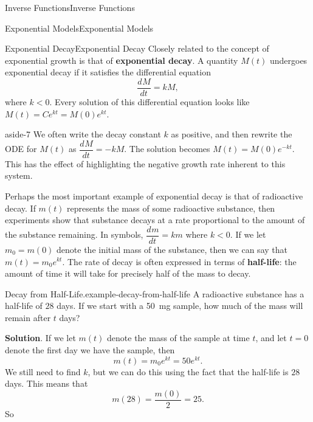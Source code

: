 \documentclass[10pt,]{book}
\newcommand{\terminology}[1]{\textbf{#1}}
\numberwithin{equation}{section}
\newcommand{\dv}[3][]{\dfrac{d^{#1} #2}{d #3^{#1}}}
\begin{document}
\begin{chapterptx}{Inverse Functions}{}{Inverse Functions}{}{}
\begin{sectionptx}{Exponential Models}{}{Exponential Models}{}{}
\typeout{************************************************}
%
\begin{subsectionptx}{Exponential Decay}{}{Exponential Decay}{}{}\label{subsection-exponential-decay}
\hypertarget{p-252}{}%
Closely related to the concept of exponential growth is that of \terminology{exponential decay}. A quantity \(M(t)\) undergoes exponential decay if it satisfies the differential equation%
\begin{equation*}
\dv{M}{t} = kM,
\end{equation*}
where \(k < 0\). Every solution of this differential equation looks like \(M(t) = Ce^{kt} = M(0)e^{kt}\).%
\begin{aside}{}{aside-7}%
\hypertarget{p-253}{}%
We often write the decay constant \(k\) as positive, and then rewrite the ODE for \(M(t)\) as \(\dv{M}{t} = -kM\). The solution becomes \(M(t) = M(0)e^{-kt}\). This has the effect of highlighting the negative growth rate inherent to this system.%
\end{aside}
\hypertarget{p-254}{}%
Perhaps the most important example of exponential decay is that of radioactive decay. If \(m(t)\) represents the mass of some radioactive substance, then experiments show that substance decays at a rate proportional to the amount of the substance remaining. In symbols, \(\dv{m}{t} = km\) where \(k < 0\). If we let \(m_{0} = m(0)\) denote the initial mass of the substance, then we can say that \(m(t) = m_{0}e^{kt}\). The rate of decay is often expressed in terms of \terminology{half-life}: the amount of time it will take for precisely half of the mass to decay.%
\begin{example}{Decay from Half-Life.}{example-decay-from-half-life}%
\hypertarget{p-255}{}%
A radioactive substance has a half-life of \(28\) days. If we start with a \SI{50}{\milli\gram} sample, how much of the mass will remain after \(t\) days?%
\par\smallskip%
\noindent\textbf{Solution}.\hypertarget{solution-55}{}\quad%
\hypertarget{p-256}{}%
If we let \(m(t)\) denote the mass of the sample at time \(t\), and let \(t=0\) denote the first day we have the sample, then%
\begin{equation*}
m(t) = m_{0}e^{kt} = 50e^{kt}.
\end{equation*}
We still need to find \(k\), but we can do this using the fact that the half-life is \(28\) days. This means that%
\begin{equation*}
m(28) = \frac{m(0)}{2} = 25.
\end{equation*}
So%
\begin{equation*}

\end{equation*}
\end{example}
\end{subsectionptx}
\end{sectionptx}
\end{chapterptx}
\end{document}
